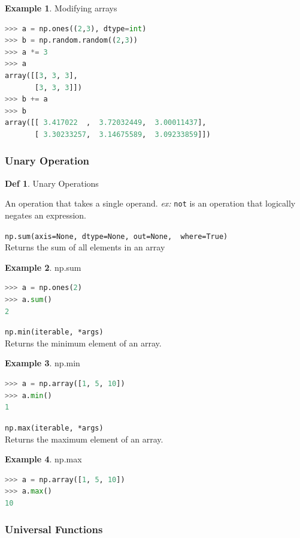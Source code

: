 \documentclass{article}
\theoremstyle{definition}
\newtheorem{df}{Def}
\newtheorem{ex}{Example}[subsection]
\theoremstyle{remark}
\newcommand{\func}[2]{\noindent\lstinline{#1}\\#2}
\begin{document}
\begin{ex} Modifying arrays
\begin{lstlisting}[language=Python]
>>> a = np.ones((2,3), dtype=int)
>>> b = np.random.random((2,3))
>>> a *= 3
>>> a
array([[3, 3, 3],
       [3, 3, 3]])
>>> b += a
>>> b
array([[ 3.417022  ,  3.72032449,  3.00011437],
       [ 3.30233257,  3.14675589,  3.09233859]])
\end{lstlisting}
\end{ex}

\subsubsection{Unary Operation}

\begin{df}Unary Operations

An operation that takes a single operand. \textit{ex:} \lstinline{not} is an operation that logically negates an expression.  
\end{df}

\func{np.sum(axis=None, dtype=None, out=None,  where=True)}{Returns the sum of all elements in an array}

\begin{ex} np.sum
\begin{lstlisting}[language=Python]
>>> a = np.ones(2)
>>> a.sum()
2
\end{lstlisting}
\end{ex}

\func{np.min(iterable, *args)}{Returns the minimum element of an array.}

\begin{ex} np.min
\begin{lstlisting}[language=Python]
>>> a = np.array([1, 5, 10])
>>> a.min()
1
\end{lstlisting}
\end{ex}

\func{np.max(iterable, *args)}{Returns the maximum element of an array.}

\begin{ex} np.max
\begin{lstlisting}[language=Python]
>>> a = np.array([1, 5, 10])
>>> a.max()
10
\end{lstlisting}
\end{ex}


\subsubsection{Universal Functions}
\end{document}
